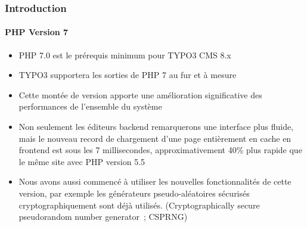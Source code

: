 \begin{frame}[fragile]
	\frametitle{Introduction}
	\framesubtitle{PHP Version 7}

	\begin{itemize}

		\item PHP 7.0 est le prérequis minimum pour TYPO3 CMS 8.x
		\item TYPO3 supportera les sorties de PHP 7 au fur et à mesure
		\item Cette montée de version apporte une amélioration
			significative des performances de l'ensemble du système

		\item Non seulement les éditeurs backend remarquerons une interface plus fluide,
			mais le nouveau record de chargement d'une page entièrement en cache en
			frontend est sous les 7 millisecondes, approximativement 40\% plus rapide
			que le même site avec PHP version 5.5

		\item Nous avons aussi commencé à utiliser les nouvelles fonctionnalités de cette version,
			par exemple les générateurs pseudo-aléatoires sécurisés cryptographiquement sont
			déjà utilisés. (Cryptographically secure pseudorandom number generator~; CSPRNG)

	\end{itemize}

\end{frame}

